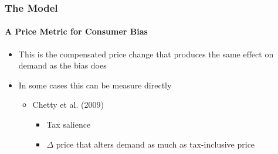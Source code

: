 \documentclass{beamer}
\begin{document}
\begin{frame}
\frametitle{The Model}
\framesubtitle{A Price Metric for Consumer Bias}



\begin{center}

\end{center}

\begin{itemize}
	\item This is the compensated price change that produces the same effect on demand as the bias does
	\item In some cases this can be measure directly 
	\begin{itemize}
		\item Chetty et al. (2009)
		\begin{itemize}
			\item  Tax salience
			\item $\Delta$ price that alters demand as much as tax-inclusive price
		\end{itemize}  
	\end{itemize}
\end{itemize}


\end{frame}
\end{document}
